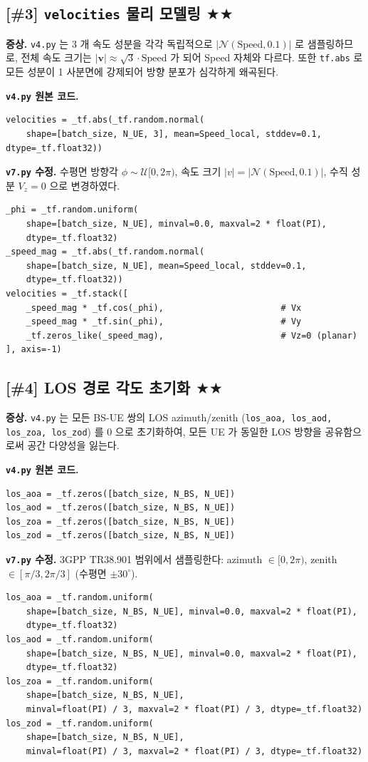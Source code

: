 \documentclass[11pt,a4paper]{article}
\newcommand{\stwo}{\textcolor{starcolor}{$\bigstar\bigstar$}}
\newcommand{\vfour}{\texttt{v4.py}}
\newcommand{\vseven}{\texttt{v7.py}}
\newcommand{\bugitem}[3]{%
  \subsection{[\##1] #2 \hfill #3}%
  \vspace{-0.5em}%
}
\begin{document}
\bugitem{3}{\texttt{velocities} 물리 모델링}{\stwo}

\textbf{증상.} \vfour{} 는 3 개 속도 성분을 각각 독립적으로
$|\mathcal{N}(\text{Speed}, 0.1)|$ 로 샘플링하므로, 전체 속도 크기는
$|\boldsymbol{v}| \approx \sqrt{3}\cdot\text{Speed}$ 가 되어 Speed 자체와
다르다. 또한 \texttt{tf.abs} 로 모든 성분이 1 사분면에 강제되어 방향
분포가 심각하게 왜곡된다.

\textbf{\vfour{} 원본 코드.}
\begin{lstlisting}[caption={v4.py: lines 1774--1775}]
velocities = _tf.abs(_tf.random.normal(
    shape=[batch_size, N_UE, 3], mean=Speed_local, stddev=0.1, dtype=_tf.float32))
\end{lstlisting}

\textbf{\vseven{} 수정.} 수평면 방향각 $\phi \sim \mathcal{U}[0, 2\pi)$,
속도 크기 $|v| = |\mathcal{N}(\text{Speed}, 0.1)|$, 수직 성분 $V_z = 0$ 으로
변경하였다.
\begin{lstlisting}[caption={v7.py: lines 2011--2023}]
_phi = _tf.random.uniform(
    shape=[batch_size, N_UE], minval=0.0, maxval=2 * float(PI),
    dtype=_tf.float32)
_speed_mag = _tf.abs(_tf.random.normal(
    shape=[batch_size, N_UE], mean=Speed_local, stddev=0.1,
    dtype=_tf.float32))
velocities = _tf.stack([
    _speed_mag * _tf.cos(_phi),                       # Vx
    _speed_mag * _tf.sin(_phi),                       # Vy
    _tf.zeros_like(_speed_mag),                       # Vz=0 (planar)
], axis=-1)
\end{lstlisting}

\bugitem{4}{LOS 경로 각도 초기화}{\stwo}

\textbf{증상.} \vfour{} 는 모든 BS-UE 쌍의 LOS azimuth/zenith
(\texttt{los\_aoa, los\_aod, los\_zoa, los\_zod}) 를 0 으로 초기화하여,
모든 UE 가 동일한 LOS 방향을 공유함으로써 공간 다양성을 잃는다.

\textbf{\vfour{} 원본 코드.}
\begin{lstlisting}[caption={v4.py: lines 1776--1779}]
los_aoa = _tf.zeros([batch_size, N_BS, N_UE])
los_aod = _tf.zeros([batch_size, N_BS, N_UE])
los_zoa = _tf.zeros([batch_size, N_BS, N_UE])
los_zod = _tf.zeros([batch_size, N_BS, N_UE])
\end{lstlisting}

\textbf{\vseven{} 수정.} 3GPP TR38.901 범위에서 샘플링한다:
azimuth $\in [0, 2\pi)$, zenith $\in [\pi/3, 2\pi/3]$ (수평면 $\pm 30^{\circ}$).
\begin{lstlisting}[caption={v7.py: lines 2030--2041}]
los_aoa = _tf.random.uniform(
    shape=[batch_size, N_BS, N_UE], minval=0.0, maxval=2 * float(PI),
    dtype=_tf.float32)
los_aod = _tf.random.uniform(
    shape=[batch_size, N_BS, N_UE], minval=0.0, maxval=2 * float(PI),
    dtype=_tf.float32)
los_zoa = _tf.random.uniform(
    shape=[batch_size, N_BS, N_UE],
    minval=float(PI) / 3, maxval=2 * float(PI) / 3, dtype=_tf.float32)
los_zod = _tf.random.uniform(
    shape=[batch_size, N_BS, N_UE],
    minval=float(PI) / 3, maxval=2 * float(PI) / 3, dtype=_tf.float32)
\end{lstlisting}
\end{document}
